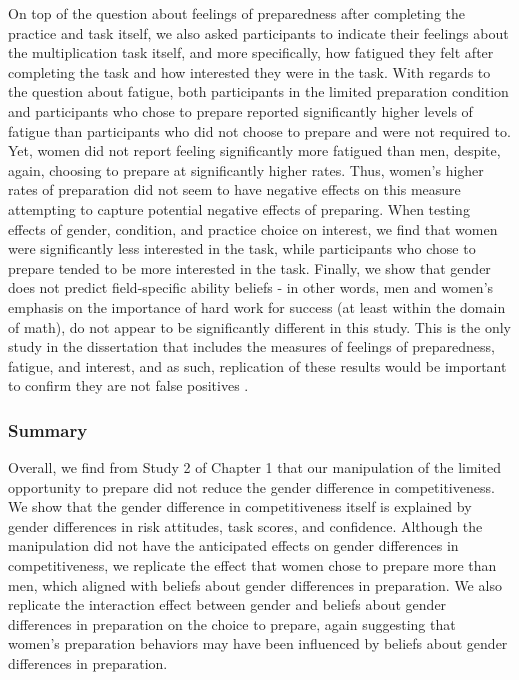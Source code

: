 \documentclass[a4paper, nobind]{templates/ociamthesis}
\begin{document}
On top of the question about feelings of preparedness after completing the practice and task itself, we also asked participants to indicate their feelings about the multiplication task itself, and more specifically, how fatigued they felt after completing the task and how interested they were in the task. With regards to the question about fatigue, both participants in the limited preparation condition and participants who chose to prepare reported significantly higher levels of fatigue than participants who did not choose to prepare and were not required to. Yet, women did not report feeling significantly more fatigued than men, despite, again, choosing to prepare at significantly higher rates. Thus, women's higher rates of preparation did not seem to have negative effects on this measure attempting to capture potential negative effects of preparing. When testing effects of gender, condition, and practice choice on interest, we find that women were significantly less interested in the task, while participants who chose to prepare tended to be more interested in the task. Finally, we show that gender does not predict field-specific ability beliefs - in other words, men and women's emphasis on the importance of hard work for success (at least within the domain of math), do not appear to be significantly different in this study. This is the only study in the dissertation that includes the measures of feelings of preparedness, fatigue, and interest, and as such, replication of these results would be important to confirm they are not false positives \autocite{Coffman2015}.

\hypertarget{summary-1}{%
\subsubsection{Summary}\label{summary-1}}

Overall, we find from Study 2 of Chapter 1 that our manipulation of the limited opportunity to prepare did not reduce the gender difference in competitiveness. We show that the gender difference in competitiveness itself is explained by gender differences in risk attitudes, task scores, and confidence. Although the manipulation did not have the anticipated effects on gender differences in competitiveness, we replicate the effect that women chose to prepare more than men, which aligned with beliefs about gender differences in preparation. We also replicate the interaction effect between gender and beliefs about gender differences in preparation on the choice to prepare, again suggesting that women's preparation behaviors may have been influenced by beliefs about gender differences in preparation.
\end{document}
